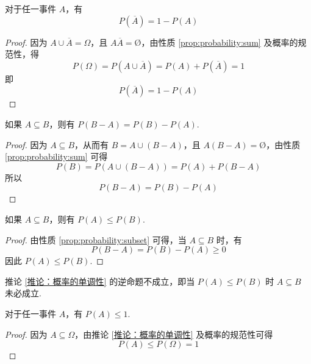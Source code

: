 \begin{property}
    \indent 对于任一事件 $A$，有
    \begin{equation}
        P(\overline{A})=1-P(A)
    \end{equation}
\end{property}

\begin{proof}
    因为 $A \cup \overline{A} = \varOmega$，且 $A \overline{A} = \text{\O}$，由性质 \ref{prop:probability:sum} 及概率的规范性，得
    $$
    P(\varOmega) = P(A \cup \overline{A}) = P(A) + P(\overline{A}) = 1
    $$
    即
    \[
    P(\overline{A})=1-P(A)
    \]
\end{proof}

\begin{property}
    \indent 如果 $A \subseteq B$，则有 $P(B-A)=P(B)-P(A)$.
\end{property}

\begin{proof}
    因为 $A \subseteq B$，从而有 $B = A \cup (B-A)$，且 $A(B-A)=\text{\O}$，由性质 \ref{prop:probability:sum} 可得
    $$
    P(B) = P(A \cup (B-A)) = P(A) + P(B-A)
    $$
    所以
    $$
    P(B-A)=P(B)-P(A)
    $$
\end{proof}

\begin{corollary}[][概率的单调性][推论：概率的单调性]
    \indent 如果 $A \subseteq B$，则有 $P(A) \leqslant P(B)$.
\end{corollary}

\begin{proof}
    由性质 \ref{prop:probability:subset} 可得，当 $A \subseteq B$ 时，有
    $$
    P(B-A) = P(B)-P(A) \geqslant 0
    $$
    因此 $P(A) \leqslant P(B)$.
\end{proof}

\begin{note}
    \indent 推论 \ref{推论：概率的单调性} 的逆命题不成立，即当 $P(A) \leqslant P(B)$ 时 $A \subseteq B$ 未必成立.
\end{note}

\begin{property}[][][prop:probability:<=1]
    \indent 对于任一事件 $A$，有 $P(A) \leqslant 1$.
\end{property}

\begin{proof}
    因为 $A \subseteq \varOmega$，由推论 \ref{推论：概率的单调性} 及概率的规范性可得
    \[
    P(A) \leqslant P(\varOmega) = 1
    \]
\end{proof}

